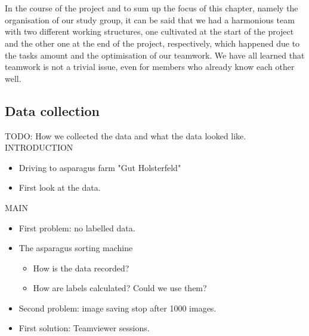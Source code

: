 \\
\\
In the course of the project and to sum up the focus of this chapter, namely the organisation of our study group, it can be said that we had a harmonious team with two different working structures, one cultivated at the start of the project and the other one at the end of the project, respectively, which happened due to the tasks amount and the optimisation of our teamwork. We have all learned that teamwork is not a trivial issue, even for members who already know each other well.


\subsection{Data collection}

TODO: How we collected the data and what the data looked like. \\

INTRODUCTION
\begin{itemize}
\item Driving to asparagus farm "Gut Holsterfeld"
\item First look at the data.
\end{itemize}

MAIN
\begin{itemize}
\item First problem: no labelled data.
\item The asparagus sorting machine
\begin{itemize}
\item How is the data recorded?
\item How are labels calculated? Could we use them?
\end{itemize}
\item Second problem: image saving stop after 1000 images.
\item First solution: Teamviewer sessions.
\end{itemize}

